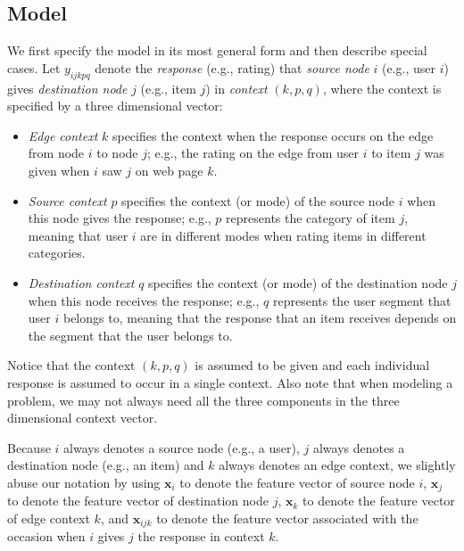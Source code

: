 \documentclass[10pt]{article}
\begin{document}
\subsection{Model}

We first specify the model in its most general form and then describe special cases.  Let $y_{ijkpq}$ denote the {\em response} (e.g., rating) that {\em source node} $i$ (e.g., user $i$) gives {\em destination node} $j$ (e.g., item $j$) in {\em context} $(k,p,q)$, where the context is specified by a three dimensional vector:
\begin{itemize}
\item {\em Edge context} $k$ specifies the context when the response occurs on the edge from node $i$ to node $j$; e.g., the rating on the edge from user $i$ to item $j$ was given when $i$ saw $j$ on web page $k$.
\item {\em Source context} $p$ specifies the context (or mode) of the source node $i$ when this node gives the response; e.g., $p$ represents the category of item $j$, meaning that user $i$ are in different modes when rating items in different categories.
\item {\em Destination context} $q$ specifies the context (or mode) of the destination node $j$ when this node receives the response; e.g., $q$ represents the user segment that user $i$ belongs to, meaning that the response that an item receives depends on the segment that the user belongs to.
\end{itemize}
Notice that the context $(k,p,q)$ is assumed to be given and each individual response is assumed to occur in a single context.  Also note that when modeling a problem, we may not always need all the three components in the three dimensional context vector.

Because $i$ always denotes a source node (e.g., a user), $j$ always denotes a destination node (e.g., an item) and $k$ always denotes an edge context, we slightly abuse our notation by using $\bm{x}_i$ to denote the feature vector of source node $i$, $\bm{x}_j$ to denote the feature vector of destination node $j$, $\bm{x}_k$ to denote the feature vector of edge context $k$, and $\bm{x}_{ijk}$ to denote the feature vector associated with the occasion when $i$ gives $j$ the response in context $k$.
\end{document}
